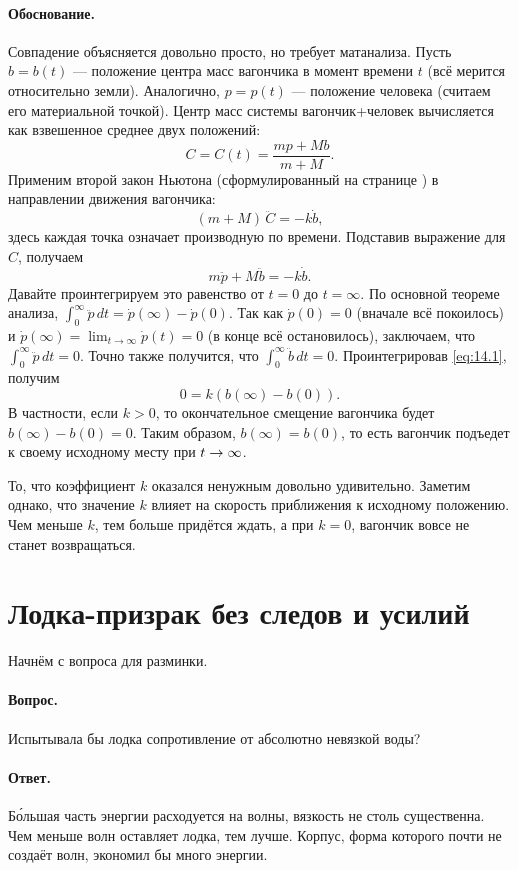 \paragraph{Обоснование.}
Совпадение объясняется довольно просто, но требует матанализа.
Пусть $b=b(t)$ --- положение центра масс вагончика в момент времени $t$ (всё мерится относительно земли).
Аналогично, $p=p(t)$ --- положение человека
(считаем его материальной точкой).
Центр масс системы вагончик+человек вычисляется как взвешенное среднее двух положений:
\[C=C(t)=\frac{m p + M b}{m + M}.\]
Применим второй закон Ньютона (сформулированный на странице \pageref{Законы Ньютона}) в направлении движения вагончика:
\[(m+M)\,\ddot{C}=-k \dot{b},\]
здесь каждая точка означает производную по времени.
Подставив выражение для $C$, получаем
\begin{equation}
m \ddot{p} + M \ddot{b}=-k \dot{b}.
\label{eq:14.1}
\end{equation}
Давайте проинтегрируем это равенство от $t=0$ до $t=\infty$.
По основной теореме анализа,
$\int_0^\infty \ddot{p}\,dt=\dot{p}(\infty) - \dot{p}(0)$.
Так как $\dot{p}(0)=0$ (вначале всё покоилось) и
$\dot{p}(\infty)=\lim_{t\to\infty}\dot{p}(t)=0$ (в конце всё остановилось),
заключаем, что
$\int_0^\infty \ddot{p}\,dt=0$.
Точно также получится, что
$\int_0^\infty \ddot{b}\,dt=0$.
Проинтегрировав \eqref{eq:14.1}, получим
\[0= k(b(\infty) - b(0)).\]
В частности, если $k > 0$, то окончательное смещение вагончика будет $b(\infty) - b(0)=0$.
Таким образом, $b(\infty)=b(0)$, то есть вагончик подъедет к своему исходному месту при $t\z\to\infty$.

То, что коэффициент $k$ оказался ненужным довольно удивительно.
Заметим однако, что значение $k$ влияет на скорость
приближения к исходному положению.
Чем меньше $k$, тем больше придётся ждать, а при $k=0$, вагончик вовсе не станет возвращаться.

\section{Лодка-призрак без следов и усилий}

Начнём с вопроса для разминки.

\paragraph{Вопрос.}
Испытывала бы лодка сопротивление от абсолютно невязкой воды?

\paragraph{Ответ.}
Б\'{о}льшая часть энергии расходуется на волны, вязкость не столь существенна.
Чем меньше волн оставляет лодка, тем лучше.
Корпус, форма которого почти не создаёт волн, экономил бы много энергии.

